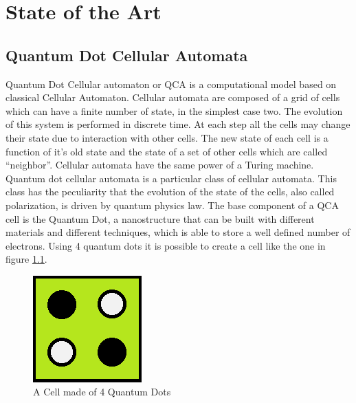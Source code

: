 \chapter{State of the Art}\label{sec:state_of_art}
\section{Quantum Dot Cellular Automata}
\label{sec:qca}
Quantum Dot Cellular automaton or QCA is a computational model based on classical Cellular Automaton. Cellular automata are composed of a grid of cells which can have a finite number of state, in the simplest case two. The evolution of this system is performed in discrete time. At each step all the cells may change their state due to interaction with other cells. The new state of each cell is a function of it's old state and the state of a set of other cells which are called "`neighbor"'. Cellular automata have the same power of a Turing machine. \newline
Quantum dot cellular automata is a particular class of cellular automata. This class has the peculiarity that the evolution of the state of the cells, also called polarization, is driven by quantum physics law.
The base component of a QCA cell is the Quantum Dot, a nanostructure that can be built with different materials and different techniques, which is able to store a well defined number of electrons. Using 4 quantum dots it is possible to create a cell like the one in figure \ref{img:cell}. 

\begin{figure}
\centering
\includegraphics[scale=0.7]{img/_Cell1.png}
\caption{A Cell made of 4 Quantum Dots}
\label{img:cell}
\end{figure}

